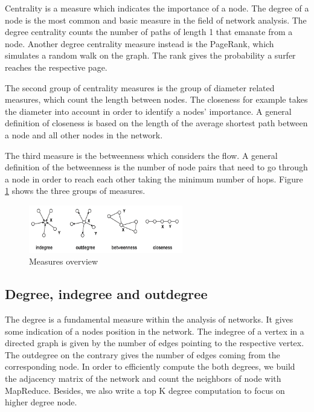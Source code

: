 Centrality is a measure which indicates the importance of a node. The degree of a node is the most common and basic measure in the field of network analysis. The degree centrality counts the number of paths of length 1 that emanate from a node. Another degree centrality measure instead is the PageRank, which simulates a random walk on the graph. The rank gives the probability a surfer reaches the respective page. 

The second group of centrality measures is the group of diameter related measures, which count the length between nodes. The closeness for example takes the diameter into account in order to identify a nodes’ importance. A general definition of closeness is based on the length of the average shortest path between a node and all other nodes in the network. 

The third measure is the betweenness which considers the flow. A general definition of the betweenness is the number of node pairs that need to go through a node in order to reach each other taking the minimum number of hops. Figure \ref{fig1} shows the three groups of measures.

\begin{figure}[H]
	\begin{center}
		\caption{Measures overview}		
		\label{fig1}		
		\includegraphics[width=0.6\textwidth]{fig1}	
	\end{center}
\end{figure}

\subsection{Degree, indegree and outdegree}
The degree is a fundamental measure within the analysis of networks. It gives some indication of a nodes position in the network. The indegree of a vertex in a directed graph is given by the number of edges pointing to the respective vertex. The outdegree on the contrary gives the number of edges coming from the corresponding node. In order to efficiently compute the both degrees, we build the adjacency matrix of the network and count the neighbors of node with MapReduce. Besides, we also write a top K degree computation to focus on higher degree node.

